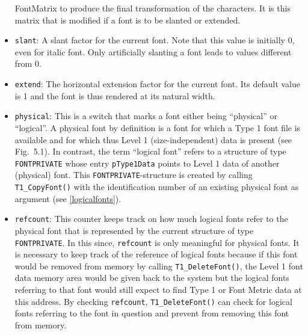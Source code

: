\begin{itemize}
  FontMatrix to produce the final transformation of the characters. It is this
  matrix that is modified if a font is to be slanted or extended.
\item \verb+slant+: A slant factor for the current font. Note that this 
  value is initially 0, even for italic font. Only artificially slanting a
  font leads to values different from 0.
\item \verb+extend+: The horizontal extension factor for the current font. Its
  default value is 1 and the font is thus rendered at its natural width.
\item \verb+physical+: This is a switch that marks a font either being
  ``physical'' or ``logical''. A physical font by definition is a font for
  which a Type 1 font file is available and for which thus Level 1
  (size-independent) data is present (see Fig.\ 5.1). In contrast, the term 
  ``logical font'' refers to a structure of type \verb+FONTPRIVATE+ whose
  entry \verb+pType1Data+ points to Level 1 data of another (physical)
  font. This \verb+FONTPRIVATE+-structure is created by calling
  \verb+T1_CopyFont()+ with the identification number of an existing physical
  font as argument (see \ref{logicalfonts}).
\item \verb+refcount+: This counter keeps track on how much logical fonts
  refer to the physical font that is represented by the current structure of
  type \verb+FONTPRIVATE+. In this since, \verb+refcount+ is only meaningful for
  physical fonts. It is necessary to keep track of the reference of logical
  fonts because if this font would be removed from memory by calling
  \verb+T1_DeleteFont()+, the Level 1 font data memory area would be given back
  to the system but the logical fonts referring to that font would still
  expect to find Type 1 or Font Metric data at this address. By checking
  \verb+refcount+, \verb+T1_DeleteFont()+ can check for logical fonts referring
  to the font in question and prevent from removing this font from memory.
  

\end{itemize}
